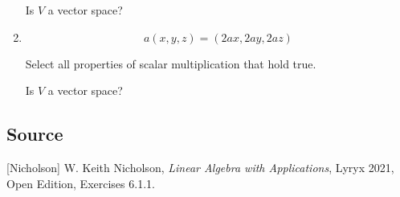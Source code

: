 \documentclass{ximera}
\begin{document}
\begin{exercise}
\begin{enumerate}
Is $V$ a vector space?
\begin{multipleChoice}
 \end{multipleChoice}

\item 
$$a(x,y,z)=(2ax, 2ay, 2az)$$

Select all properties of scalar multiplication that hold true.
\begin{selectAll}
\end{selectAll}

Is $V$ a vector space?
\begin{multipleChoice}
 \end{multipleChoice}

\end{enumerate}
 \end{exercise}

\subsection*{Source}
[Nicholson] W. Keith Nicholson, {\it Linear Algebra with Applications}, Lyryx 2021, Open Edition, Exercises 6.1.1.  
\end{document}
